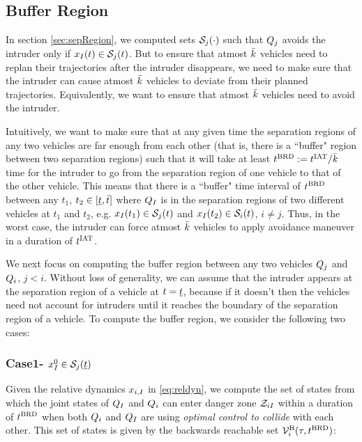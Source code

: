 \subsection{Buffer Region} \label{sec:buffRegion}
In section \ref{sec:sepRegion}, we computed sets $\mathcal{S}_j(\cdot)$ such that $Q_j$ avoids the intruder only if $x_{I}(t) \in \mathcal{S}_j(t)$. But to ensure that atmost $\bar{k}$ vehicles need to replan their trajectories after the intruder disappears, we need to make sure that the intruder can cause atmost $\bar{k}$ vehicles to deviate from their planned trajectories. Equivalently, we want to ensure that atmost $\bar{k}$ vehicles need to avoid the intruder. 

Intuitively, we want to make sure that at any given time the separation regions of any two vehicles are far enough from each other (that is, there is a ``buffer" region between two separation regions) such that it will take at least $t^\text{BRD} := t^\text{IAT} / \bar{k}$ time for the intruder to go from the separation region of one vehicle to that of the other vehicle. This means that there is a ``buffer" time interval of $t^\text{BRD}$ between any $t_1$, $t_2 \in [\underline{t}, \bar{t}]$ where $Q_{I}$ is in the separation regions of two different vehicles at $t_1$ and $t_2$, e.g. $x_{I}(t_1) \in \mathcal{S}_j(t)$ and $x_{I}(t_2) \in \mathcal{S}_i(t)$, $i \neq j$. Thus, in the worst case, the intruder can force atmost $\bar{k}$ vehicles to apply avoidance maneuver in a duration of $t^\text{IAT}$. 

We next focus on computing the buffer region between any two vehicles $Q_j$ and $Q_i$, $j < i$. Without loss of generality, we can assume that the intruder appears at the separation region of a vehicle at $t = \underline{t}$, because if it doesn't then the vehicles need not account for intruders until it reaches the boundary of the separation region of a vehicle. To compute the buffer region, we consider the following two cases:     

\subsubsection{Case1- $x_{I}^0 \in \mathcal{S}_j(\underline{t})$} \label{sec:buffCase1}
Given the relative dynamics $x_{i, I}$ in \eqref{eq:reldyn}, we compute the set of states from which the joint states of $Q_{I}$ and $Q_{i}$ can enter danger zone $\mathcal{Z}_{iI}$ within a duration of $t^\text{BRD}$ when both $Q_{i}$ and $Q_{I}$ are using \textit{optimal control to collide} with each other. This set of states is given by the backwards reachable set $\mathcal{V}^{\text{B}}_i(\tau, t^\text{BRD})$: 

